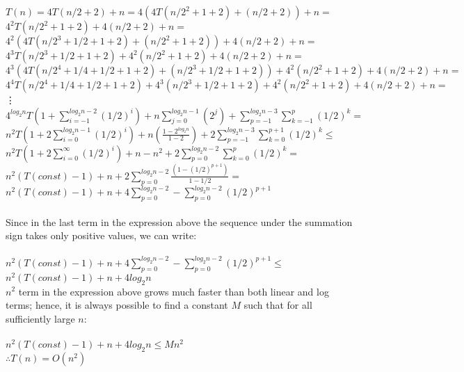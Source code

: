 \documentclass[a4paper]{article}
\begin{document}
\begin{itemize}
$T(n) = 4T(n/2 +2) + n = 4(4T(n/2^2 + 1 + 2) + (n/2 + 2)) + n = $ \\
$4^2T(n/2^2 +1 + 2) + 4(n/2 + 2) + n = $ \\
$4^2(4T(n/2^3 + 1/2 + 1 + 2) + (n/2^2 + 1 + 2)) + 4(n/2 + 2) + n = $ \\
$4^3T(n/2^3 + 1/2 + 1 + 2) + 4^2(n/2^2 + 1 + 2) + 4(n/2 + 2) + n = $ \\
$4^3(4T(n/2^4 + 1/4 + 1/2 + 1 + 2) + (n/2^3 + 1/2 + 1 + 2)) + 4^2(n/2^2 + 1 + 2) + 4(n/2 + 2) + n = $ \\
$4^4T(n/2^4 + 1/4 + 1/2 + 1 + 2) + 4^3(n/2^3 + 1/2 + 1 + 2) + 4^2(n/2^2 + 1 + 2) + 4(n/2 + 2) + n = $ \\
\vdots \\
$4^{log_2n}T(1 + \sum\limits_{i =-1}^{log_{2}n - 2} (1/2)^i) + n\sum\limits_{j=0}^{log_2n - 1} (2^j) + \sum\limits_{p=-1}^{log_2n - 3} \sum \limits_{k = -1}^{p} (1/2)^k = $ \\
$ n^2T(1+2\sum\limits_{i=0}^{log_2n - 1} (1/2)^i) + n(\frac{1-2^{log_2n}}{1-2}) + 2\sum\limits_{p=-1}^{log_2n - 3} \sum \limits_{k = 0}^{p+1} (1/2)^k \leq $ \\
$n^2T(1 + 2\sum\limits_{i=0}^{\infty} (1/2)^i) + n - n^2 + 2\sum\limits_{p=0}^{log_2n - 2} \sum \limits_{k = 0}^{p} (1/2)^k = $ \\
$n^2(T(const) - 1) + n + 2\sum\limits_{p=0}^{log_2n - 2} \frac{(1 - (1/2)^{p+1})}{1 - 1/2} = $ \\
$n^2(T(const) - 1) + n + 4\sum\limits_{p = 0}^{log_2n - 2} - \sum \limits_{p=0}^{log_2n - 2} (1/2)^{p+1}$ \\ \\
Since in the last term in the expression above the sequence under the summation sign takes only positive values, we can write: \\ \\
$n^2(T(const) - 1) + n + 4\sum\limits_{p = 0}^{log_2n - 2} - \sum \limits_{p=0}^{log_2n - 2} (1/2)^{p+1} \leq$ \\
$n^2(T(const) - 1) + n + 4log_2n$ \\
$n^2$ term in the expression above grows much faster than both linear and log terms; hence, it is always possible to find a constant $M$ such that for all sufficiently large $n$: \\ \\
$n^2(T(const) - 1) + n + 4log_2n \leq Mn^2$ \\
$\therefore T(n) = O(n^2)$ \\ \\


\end{itemize}
\end{document}
